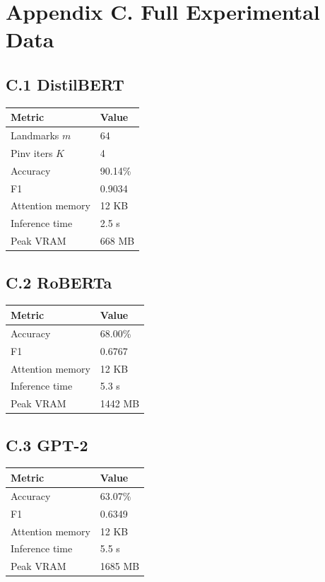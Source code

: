 
\section{Appendix C. Full Experimental Data}

\subsection{C.1 DistilBERT}

\begin{table}[H]
\centering
\small
\begin{tabular}{ll}
\toprule
\textbf{Metric} & \textbf{Value} \\
\midrule
Landmarks $m$ & 64 \\
Pinv iters $K$ & 4 \\
Accuracy & 90.14\% \\
F1 & 0.9034 \\
Attention memory & 12 KB \\
Inference time & 2.5 s \\
Peak VRAM & 668 MB \\
\bottomrule
\end{tabular}
\end{table}

\subsection{C.2 RoBERTa}

\begin{table}[H]
\centering
\small
\begin{tabular}{ll}
\toprule
\textbf{Metric} & \textbf{Value} \\
\midrule
Accuracy & 68.00\% \\
F1 & 0.6767 \\
Attention memory & 12 KB \\
Inference time & 5.3 s \\
Peak VRAM & 1442 MB \\
\bottomrule
\end{tabular}
\end{table}

\subsection{C.3 GPT-2}

\begin{table}[H]
\centering
\small
\begin{tabular}{ll}
\toprule
\textbf{Metric} & \textbf{Value} \\
\midrule
Accuracy & 63.07\% \\
F1 & 0.6349 \\
Attention memory & 12 KB \\
Inference time & 5.5 s \\
Peak VRAM & 1685 MB \\
\bottomrule
\end{tabular}
\end{table}

